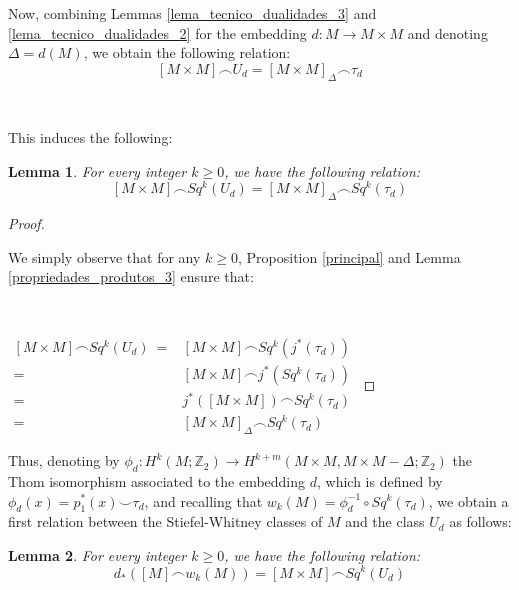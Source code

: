 \documentclass[12pt,oneside]{book}
\newtheorem{lem}    {Lemma}[chapter]
\newcommand{\Z}{\mathbb{Z}}
\newcommand{\ccup}{\smile}
\newcommand{\ccap}{\frown}
\begin{document}
    Now, combining Lemmas \ref{lema_tecnico_dualidades_3} and \ref{lema_tecnico_dualidades_2} for the embedding $d:M\to M\times M$ and 
    denoting $\Delta=d(M)$, we obtain the following relation:
    $$ [M\times M]\ccap U_{d}=[M\times M]_{\Delta}\ccap \tau_{d} $$

    \

    This induces the following:

    \begin{lem}
    	For every integer $k\geq 0$, we have the following relation:
    	$$ [M\times M]\ccap Sq^{k}(U_{d})=[M\times M]_{\Delta}\ccap Sq^{k}(\tau_{d}) $$
    \end{lem}

    \begin{proof}

        \

        We simply observe that for any $k\geq 0$, Proposition \ref{principal} and Lemma \ref{propriedades_produtos_3} ensure that:

        \

        $\begin{array}{rl}
        	[M\times M]\ccap Sq^{k}(U_{d}) \ = & [M\times M]\ccap Sq^{k}(j^{*}(\tau_{d})) \\
        	= & [M\times M]\ccap j^{*}(Sq^{k}(\tau_{d})) \\
        	= & j^{*}([M\times M])\ccap Sq^{k}(\tau_{d}) \\
        	= & [M\times M]_{\Delta}\ccap Sq^{k}(\tau_{d})
        \end{array}$

    \end{proof}

    Thus, denoting by $\phi_{d}:H^{k}(M;\Z_{2})\to H^{k+m}(M\times M,M\times M-\Delta;\Z_{2})$ the Thom isomorphism 
    associated to the embedding $d$, which is defined by $\phi_{d}(x)=p_{1}^{*}(x)\ccup\tau_{d}$, and recalling that 
    $w_{k}(M)=\phi^{-1}_{d}\circ Sq^{k}(\tau_{d})$, we obtain a first relation between the Stiefel-Whitney 
    classes of $M$ and the class $U_{d}$ as follows:

    \begin{lem}
	    For every integer $k \geq 0$, we have the following relation:
	    $$ d_{*}([M] \ccap w_{k}(M)) = [M \times M] \ccap Sq^{k}(U_{d}) $$
    \end{lem}
\end{document}
